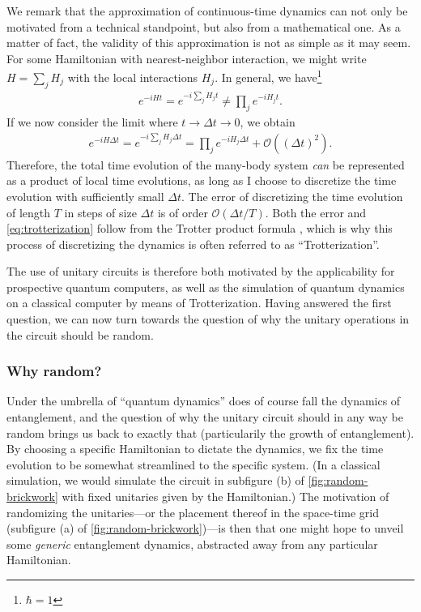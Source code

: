 We remark that the approximation of continuous-time dynamics can not only be
motivated from a technical standpoint, but also from a mathematical one. As a
matter of fact, the validity of this approximation is not as simple as it may
seem. For some Hamiltonian with nearest-neighbor interaction, we might write
$H= \sum_j H_j$ with the local interactions $H_j$. In general, we
have\footnote{$\hbar=1$}
\begin{align}
  e^{-iHt} = e^{-i\sum_j H_j t} \neq \prod_j e^{-iH_jt}
.\end{align}
If we now consider the limit where $t \to \Delta t \to 0$, we obtain
\begin{align}\label{eq:trotterization}
  e^{-iH\Delta t} = e^{-i\sum_j H_j \Delta t} = \prod_j e^{-iH_j \Delta t} +
  \mathcal{O}\left(\left(\Delta t\right)^2\right)
.\end{align}
Therefore, the total time evolution of the many-body system \emph{can} be
represented as a product of local time evolutions, as long as I choose to
discretize the time evolution with sufficiently small $\Delta t$. The error of
discretizing the time evolution of length $T$ in steps of size $\Delta t$ is of
order $\mathcal{O}(\Delta t / T)$. Both the error and \cref{eq:trotterization}
follow from the Trotter product formula
\cite{hallElementaryIntroductionGroups2000}, which is why this process of
discretizing the dynamics is often referred to as \enquote{Trotterization}.

The use of unitary circuits is therefore both motivated by the applicability
for prospective
quantum computers, as well as the simulation of quantum dynamics on a
classical computer by means of Trotterization. Having answered the first
question, we can now turn towards the question of why the unitary operations in
the circuit should be random.

\subsubsection{Why random?}

Under the umbrella of \enquote{quantum dynamics} does of course fall
the dynamics of entanglement, and the question of why the unitary circuit
should in any way be random brings us back to exactly that (particularily the
growth of entanglement). By choosing a
specific Hamiltonian to dictate the dynamics, we fix the time evolution to be
somewhat streamlined to the specific system. (In a classical simulation, we
would simulate the circuit in subfigure (b) of \cref{fig:random-brickwork} with
fixed unitaries given by the Hamiltonian.) The motivation of randomizing the
unitaries---or the placement thereof in the space-time grid (subfigure (a) of
\cref{fig:random-brickwork})---is then that one might hope to unveil some
\emph{generic} entanglement dynamics, abstracted away from any particular
Hamiltonian.

